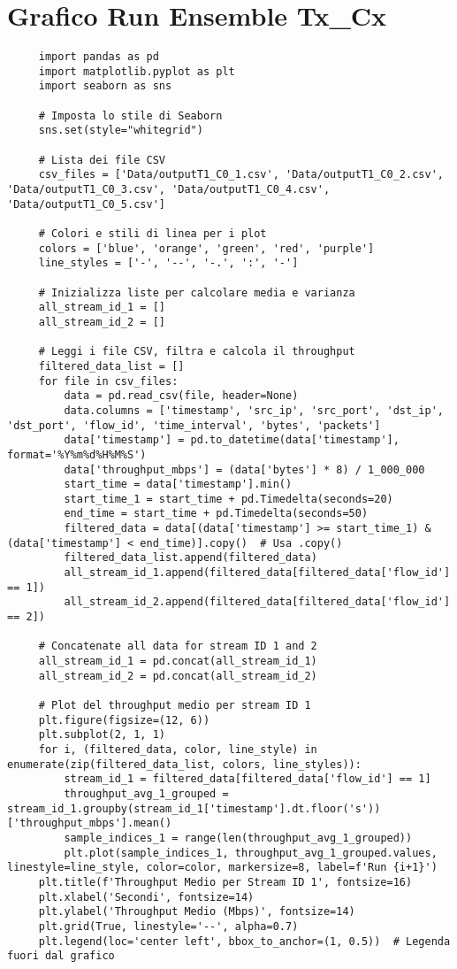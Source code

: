 \section{Grafico Run Ensemble Tx\_Cx}
\label{plot_test_spaghetti}
\begin{lstlisting}
     import pandas as pd
     import matplotlib.pyplot as plt
     import seaborn as sns
     
     # Imposta lo stile di Seaborn
     sns.set(style="whitegrid")
     
     # Lista dei file CSV
     csv_files = ['Data/outputT1_C0_1.csv', 'Data/outputT1_C0_2.csv', 'Data/outputT1_C0_3.csv', 'Data/outputT1_C0_4.csv', 'Data/outputT1_C0_5.csv']
     
     # Colori e stili di linea per i plot
     colors = ['blue', 'orange', 'green', 'red', 'purple']
     line_styles = ['-', '--', '-.', ':', '-']
     
     # Inizializza liste per calcolare media e varianza
     all_stream_id_1 = []
     all_stream_id_2 = []
     
     # Leggi i file CSV, filtra e calcola il throughput
     filtered_data_list = []
     for file in csv_files:
         data = pd.read_csv(file, header=None)
         data.columns = ['timestamp', 'src_ip', 'src_port', 'dst_ip', 'dst_port', 'flow_id', 'time_interval', 'bytes', 'packets']
         data['timestamp'] = pd.to_datetime(data['timestamp'], format='%Y%m%d%H%M%S')
         data['throughput_mbps'] = (data['bytes'] * 8) / 1_000_000
         start_time = data['timestamp'].min()
         start_time_1 = start_time + pd.Timedelta(seconds=20)
         end_time = start_time + pd.Timedelta(seconds=50)
         filtered_data = data[(data['timestamp'] >= start_time_1) & (data['timestamp'] < end_time)].copy()  # Usa .copy()
         filtered_data_list.append(filtered_data)
         all_stream_id_1.append(filtered_data[filtered_data['flow_id'] == 1])
         all_stream_id_2.append(filtered_data[filtered_data['flow_id'] == 2])
     
     # Concatenate all data for stream ID 1 and 2
     all_stream_id_1 = pd.concat(all_stream_id_1)
     all_stream_id_2 = pd.concat(all_stream_id_2)
     
     # Plot del throughput medio per stream ID 1
     plt.figure(figsize=(12, 6))
     plt.subplot(2, 1, 1)
     for i, (filtered_data, color, line_style) in enumerate(zip(filtered_data_list, colors, line_styles)):
         stream_id_1 = filtered_data[filtered_data['flow_id'] == 1]
         throughput_avg_1_grouped = stream_id_1.groupby(stream_id_1['timestamp'].dt.floor('s'))['throughput_mbps'].mean()
         sample_indices_1 = range(len(throughput_avg_1_grouped))
         plt.plot(sample_indices_1, throughput_avg_1_grouped.values, linestyle=line_style, color=color, markersize=8, label=f'Run {i+1}')
     plt.title(f'Throughput Medio per Stream ID 1', fontsize=16)
     plt.xlabel('Secondi', fontsize=14)
     plt.ylabel('Throughput Medio (Mbps)', fontsize=14)
     plt.grid(True, linestyle='--', alpha=0.7)
     plt.legend(loc='center left', bbox_to_anchor=(1, 0.5))  # Legenda fuori dal grafico
     

\end{lstlisting}
